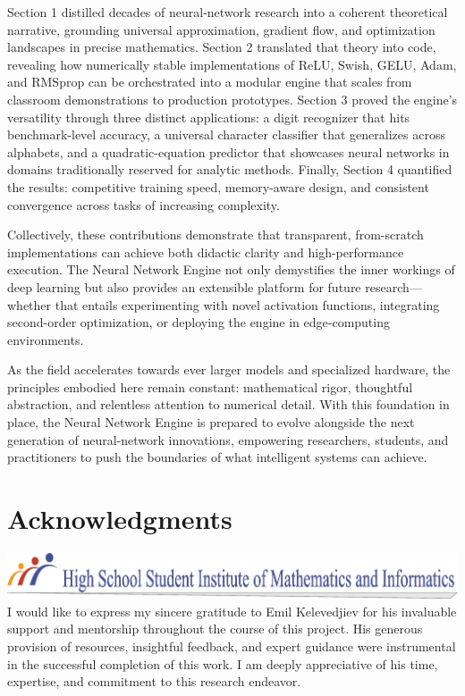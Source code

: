 \documentclass[11pt,a4paper]{report}
\begin{document}
Section 1 distilled decades of neural-network research into a coherent theoretical narrative, grounding universal approximation, gradient flow, and optimization landscapes in precise mathematics. Section 2 translated that theory into code, revealing how numerically stable implementations of ReLU, Swish, GELU, Adam, and RMSprop can be orchestrated into a modular engine that scales from classroom demonstrations to production prototypes. Section 3 proved the engine's versatility through three distinct applications: a digit recognizer that hits benchmark-level accuracy, a universal character classifier that generalizes across alphabets, and a quadratic-equation predictor that showcases neural networks in domains traditionally reserved for analytic methods. Finally, Section 4 quantified the results: competitive training speed, memory-aware design, and consistent convergence across tasks of increasing complexity.

Collectively, these contributions demonstrate that transparent, from-scratch implementations can achieve both didactic clarity and high-performance execution. The Neural Network Engine not only demystifies the inner workings of deep learning but also provides an extensible platform for future research—whether that entails experimenting with novel activation functions, integrating second-order optimization, or deploying the engine in edge-computing environments.

As the field accelerates towards ever larger models and specialized hardware, the principles embodied here remain constant: mathematical rigor, thoughtful abstraction, and relentless attention to numerical detail. With this foundation in place, the Neural Network Engine is prepared to evolve alongside the next generation of neural-network innovations, empowering researchers, students, and practitioners to push the boundaries of what intelligent systems can achieve.

\chapter{Acknowledgments}
\noindent
\includegraphics[width=\textwidth]{uchimi_logo.jpg}
I would like to express my sincere gratitude to Emil Kelevedjiev for his invaluable support and mentorship throughout the course of this project. His generous provision of resources, insightful feedback, and expert guidance were instrumental in the successful completion of this work. I am deeply appreciative of his time, expertise, and commitment to this research endeavor.

\newpage
\nocite{*}


\end{document}
